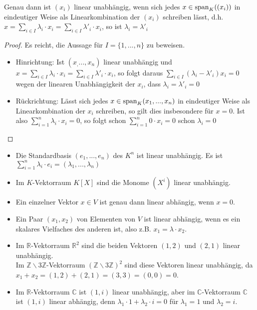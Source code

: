 \begin{proposition}
	Genau dann ist $(x_i)$ linear unabhängig, wenn sich jedes $x\in \operatorname{span}_K((x_i))$ in eindeutiger Weise 
	als Linearkombination der $(x_i)$ schreiben lässt, d.h. $x=\sum_{i\in I} \lambda_i\cdot x_i=\sum_{i
		\in I} \lambda'_i\cdot x_i$, so ist $\lambda_i=\lambda'_i$
\end{proposition}
\begin{proof}
	Es reicht, die Aussage für $I=\{1,...,n\}$ zu beweisen.
	\begin{itemize}
		\item Hinrichtung:  Ist $(x_,...,x_n)$ linear unabhängig und $x=\sum_{i\in I} \lambda_i\cdot x_i=\sum_{i\in I}
		\lambda'_i\cdot x_i$, so folgt daraus $\sum_{i\in I} (\lambda_i-\lambda'_i)x_i=0$ wegen der linearen 
		Unabhängigkeit der $x_i$, dass $\lambda_i=\lambda'_i=0$\\
		\item Rückrichtung: Lässt sich jedes $x\in \operatorname{span}_K(x_1,...,x_n)$ in eindeutiger Weise als Linearkombination der $x_i$ schreiben, 
		so gilt dies insbesondere für $x=0$. Ist also $\sum_{i=1}^n \lambda_i\cdot x_i=0$, so folgt schon $\sum_{
			i=1}^n 0\cdot x_i=0$ schon $\lambda_i=0$
	\end{itemize}
\end{proof}

\begin{example}
	\begin{itemize}
		\item Die Standardbasis $(e_1,...,e_n)$ des $K^n$ ist linear unabhängig. Es ist $\sum_{i=1}^n \lambda_i\cdot 
		e_i=(\lambda_1,...,\lambda_n)$
		\item Im $K$-Vektorraum $K[X]$ sind die Monome $(X^i)$ linear unabhängig.
		\item Ein einzelner Vektor $x\in V$ ist genau dann linear abhängig, wenn $x=0$.
		\item Ein Paar $(x_1,x_2)$ von Elementen von $V$ ist linear abhängig, wenn es ein skalares Vielfaches des anderen ist, also z.B. $x_1=
		\lambda\cdot x_2$.
		\item Im $\mathbb R$-Vektorraum $\mathbb R^2$ sind die beiden Vektoren $(1,2)$ und $(2,1)$ linear unabhängig. \\
		Im $\mathbb Z\backslash 3\mathbb Z$-Vektorraum $(\mathbb Z\backslash 3\mathbb Z)^2$ sind diese Vektoren linear unabhängig, da 
		$x_1+x_2=(1,2)+(2,1)=(3,3)=(0,0)=0$. 
		\item Im $\mathbb R$-Vektorraum $\mathbb C$ ist $(1,i)$ linear unabhängig, aber im $\mathbb C$-Vektorraum $\mathbb C$ ist $(1,i)$ 
		linear abhängig, denn $\lambda_1\cdot 1+\lambda_2\cdot i =0$ für $\lambda_1=1$ und $\lambda_2=i$.
	\end{itemize}
\end{example}

